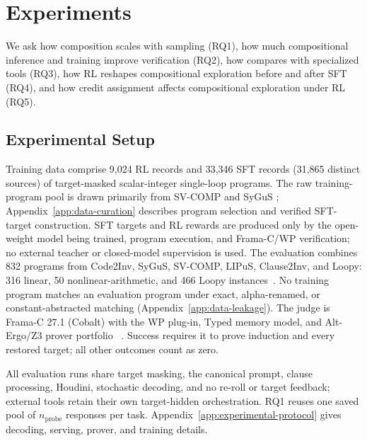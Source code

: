 \section{Experiments}\label{sec:experiments}

We ask how composition scales with sampling (RQ1), how much compositional
inference and training improve verification (RQ2), how \sam{} compares with
specialized tools (RQ3), how RL reshapes compositional exploration before and
after SFT (RQ4),
and how credit assignment affects compositional exploration under RL (RQ5).

\subsection{Experimental Setup}
\label{sec:exp:setup}

Training data comprise 9,024 RL records and 33,346 SFT records (31,865
distinct sources) of target-masked scalar-integer single-loop programs.
The raw training-program pool is drawn primarily from SV-COMP and SyGuS
\citep{svcomp,alur2013sygus}; Appendix~\ref{app:data-curation} describes
program selection and verified SFT-target construction.  SFT
targets and RL rewards are produced only by the open-weight model being trained,
program execution, and Frama-C/WP verification; no external teacher or
closed-model supervision is used.  The
evaluation combines 832 programs from Code2Inv, SyGuS, SV-COMP, LIPuS,
Clause2Inv, and Loopy: 316 linear, 50 nonlinear-arithmetic, and 466 Loopy
instances~\citep{si2020code2inv,alur2013sygus,svcomp,yu2023lipus,
cao2025clause2inv,kamath2023finding}.  No training program matches an
evaluation program under exact, alpha-renamed, or constant-abstracted matching
(Appendix~\ref{app:data-leakage}).  The judge is Frama-C 27.1 (Cobalt) with
the WP plug-in, Typed memory model, and Alt-Ergo/Z3 prover portfolio
~\citep{framac}.  Success requires it to prove induction and every restored
target; all other outcomes count as zero.

All \sam{} evaluation runs share target masking, the canonical prompt, clause
processing, Houdini, stochastic decoding, and no re-roll or target feedback;
external tools retain their own target-hidden orchestration.  RQ1 reuses one
saved pool of \(n_{\mathrm{probe}}\) responses per task.  Appendix~\ref{app:experimental-protocol}
gives decoding, serving, prover, and training details.


